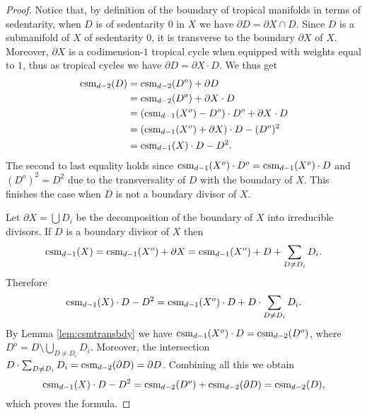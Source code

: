 \begin{proof}
Notice that, by definition of the boundary of tropical manifolds in terms of sedentarity, when $D$ is of sedentarity $0$ in $X$ we have $\partial D = \partial X \cap D$. 
Since $D$ is a submanifold of $X$ of sedentarity $0$, it is transverse to the  boundary $\partial X$ of $X$.
Moreover, $\partial X$ is a codimension-$1$ tropical cycle when equipped with weights equal to $1$,  
thus as tropical cycles we have 
$\partial D =  \partial X \cdot D$. 
We thus get
\begin{align*}
\operatorname{csm}_{d-2}(D) &= \operatorname{csm}_{d-2}(D^o) + \partial D \\
&= \operatorname{csm}_{d-2}(D^o) + \partial X  \cdot  D \\
&= (\operatorname{csm}_{d-1}(X^o) -D^o) \cdot D^o + \partial X  \cdot  D \\
&= (\operatorname{csm}_{d-1}(X^o) + \partial X)  \cdot  D - (D^o)^2 \\
&= \operatorname{csm}_{d-1}(X)  \cdot  D - D^2.
\end{align*}
The second to last equality holds since $\operatorname{csm}_{d-1}(X^o) \cdot D^o = \operatorname{csm}_{d-1}(X^o) \cdot D$ and $(D^o)^2 = D^2$ due to the transversality of $D$ with the boundary of $X$. This finishes the case when $D$ is not a  boundary divisor of $X$. 

Let $\partial X = \bigcup D_i$ be the decomposition of the boundary of $X$ into irreducible divisors. If $D$ is a boundary divisor of $X$ then
$$\operatorname{csm}_{d-1}(X) = \operatorname{csm}_{d-1}(X^o) + \partial X = \operatorname{csm}_{d-1}(X^o) + D + \sum_{D \neq D_i} D_i.$$   
Therefore
$$\operatorname{csm}_{d-1}(X) \cdot  D - D^2 = \operatorname{csm}_{d-1}(X^o) \cdot D + D \cdot   \sum_{D \neq D_i} D_i.$$
By Lemma \ref{lem:csmtransbdy} we have  
$\operatorname{csm}_{d-1}(X^o) \cdot D = \operatorname{csm}_{d-2}(D^o)$,  
where $D^o=D\setminus\bigcup_{D \neq D_i}D_i$. 
Moreover, the intersection 
$D\cdot \sum_{D \neq D_i} D_i =  \operatorname{csm}_{d-2}(\partial D) = \partial D$.
Combining all this we obtain
$$\operatorname{csm}_{d-1}(X) \cdot  D - D^2 = \operatorname{csm}_{d-2}(D^o) + \operatorname{csm}_{d-2}(\partial D) = \operatorname{csm}_{d-2}(D),$$
which proves the formula. 
\end{proof}